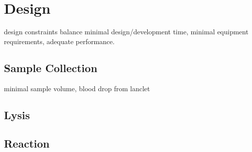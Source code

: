 \documentclass{article}
\begin{document}
\section{Design}

design constraints balance minimal design/development time, minimal equipment requirements, adequate performance.

\subsection{Sample Collection}

minimal sample volume, blood drop from lanclet 

\subsection{Lysis}

\cite{malmsten2005reverse}

\cite{karamohamed1998bioluminometric}

\cite{curtis2008rapid}

\subsection{Reaction}





\end{document}
